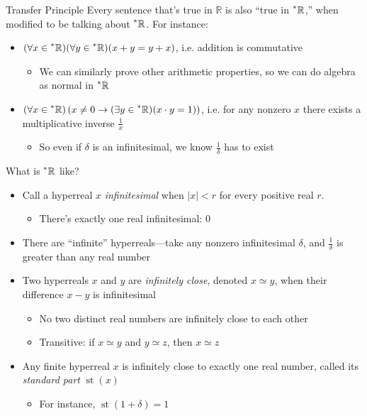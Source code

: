 \documentclass{beamer}
\theoremstyle{plain}
\theoremstyle{definition}
\newcommand{\stp}[1]{\st\left(#1\right)}
\newcommand{\reals}{\mathbb{R}}
\newcommand{\hreals}{\prescript{*}{}{\mathbb{R}}}
\DeclareMathOperator{\st}{st}
\begin{document}
\begin{frame}{Transfer Principle}
Every sentence that's true in $\reals$ is also ``true in $\hreals$,'' when modified to be talking about $\hreals$. For instance: \vspace{6pt}
\begin{itemize} \itemsep = 8pt
	\item $(\forall x \in \hreals)(\forall y \in \hreals)(x + y = y + x)$, i.e. addition is commutative
	\begin{itemize}
		\item We can similarly prove other arithmetic properties, so we can do algebra as normal in $\hreals$
	\end{itemize}
	\item $(\forall x \in \hreals)\left(x \neq 0 \to (\exists y \in \hreals)(x \cdot y = 1)\right)$, i.e. for any nonzero $x$ there exists a multiplicative inverse $\frac{1}{x}$
	\begin{itemize}
		\item So even if $\delta$ is an infinitesimal, we know $\frac{1}{\delta}$ has to exist
	\end{itemize}
\end{itemize}
\end{frame}

\begin{frame}{What is $\hreals$ like?} 
\begin{itemize} \itemsep = 8pt
\item Call a hyperreal $x$ \textit{infinitesimal} when $|x| < r$ for every positive real $r$. 
	\begin{itemize}
	\item There's exactly one real infinitesimal: $0$
	\end{itemize}
\item There are ``infinite'' hyperreals---take any nonzero infinitesimal $\delta$, and $\frac{1}{\delta}$ is greater than any real number
\item Two hyperreals $x$ and $y$ are \textit{infinitely close}, denoted $x \simeq y$, when their difference $x - y$ is infinitesimal
	\begin{itemize}
	\item No two distinct real numbers are infinitely close to each other
	\item Transitive: if $x \simeq y$ and $y \simeq z$, then $x \simeq z$
	\end{itemize}
\item Any finite hyperreal $x$ is infinitely close to exactly one real number, called its \textit{standard part} $\stp{x}$
	\begin{itemize}
	\item For instance, $\stp{1 + \delta} = 1$
	\end{itemize}
\end{itemize}
\end{frame}
\end{document}
